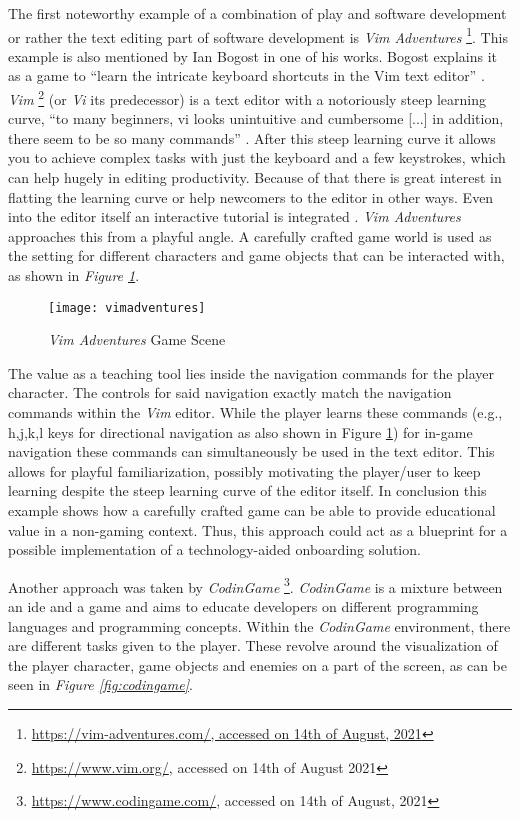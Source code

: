The first noteworthy example of a combination of play and software development or rather the text editing part of software development is \textit{Vim Adventures} \footnote{\url{https://vim-adventures.com/, accessed on 14th of August, 2021}}. This example is also mentioned by Ian Bogost in one of his works. Bogost explains it as a game to \enquote{learn the intricate keyboard shortcuts in the Vim text editor} \cite[p. 68]{bogost2011things}. \textit{Vim} \footnote{\url{https://www.vim.org/}, accessed on 14th of August 2021} (or \textit{Vi} its predecessor) is a text editor with a notoriously steep learning curve, \enquote{to many beginners, vi looks unintuitive and cumbersome [...] in addition, there seem to be so many commands} \cite[p. 3]{robbins2008learning}. After this steep learning curve it allows you to achieve complex tasks with just the keyboard and a few keystrokes, which can help hugely in editing productivity. Because of that there is great interest in flatting the learning curve or help newcomers to the editor in other ways. Even into the editor itself an interactive tutorial is integrated \cite{vimtutor}. \textit{Vim Adventures} approaches this from a playful angle. A carefully crafted game world is used as the setting for different characters and game objects that can be interacted with, as shown in \textit{Figure \ref{fig:vim-adventures}}.

\begin{figure}[h]
  \centering
  \texttt{[image: vimadventures]}
  \caption{\textit{Vim Adventures} Game Scene}
  \label{fig:vim-adventures}
\end{figure}

The value as a teaching tool lies inside the navigation commands for the player character. The controls for said navigation exactly match the navigation commands within the \textit{Vim} editor. While the player learns these commands (e.g., h,j,k,l keys for directional navigation as also shown in Figure \ref{fig:vim-adventures}) for in-game navigation these commands can simultaneously be used in the text editor. This allows for playful familiarization, possibly motivating the player/user to keep learning despite the steep learning curve of the editor itself. In conclusion this example shows how a carefully crafted game can be able to provide educational value in a non-gaming context. Thus, this approach could act as a blueprint for a possible implementation of a technology-aided onboarding solution.

Another approach was taken by \textit{CodinGame} \footnote{\url{https://www.codingame.com/}, accessed on 14th of August, 2021}. \textit{CodinGame} is a mixture between an \gls{ide} and a game and aims to educate developers on different programming languages and programming concepts. Within the \textit{CodinGame} environment, there are different tasks given to the player. These revolve around the visualization of the player character, game objects and enemies on a part of the screen, as can be seen in \textit{Figure \ref{fig:codingame}}.

